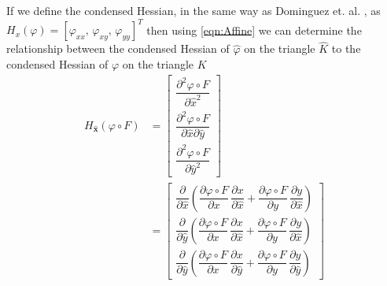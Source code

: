 If we define the condensed Hessian, in the same way as Dominguez et. al.
\cite{Dominguez08}, as $H_x(\varphi) = \left[ \varphi_{xx},\, \varphi_{xy},\,
\varphi_{yy}\right]^T$ then using \eqref{eqn:Affine} we can determine the
relationship between the condensed Hessian of $\hat{\varphi}$ on the triangle
$\hat{K}$ to the condensed Hessian of $\varphi$ on the triangle $K$
\begin{align*}
  H_{\mathbf{\hat{x}}}(\varphi\circ F) &= \begin{bmatrix}
    \dfrac{\partial^2 \varphi\circ F}{\partial \hat{x}^2} \\[1em]
    \dfrac{\partial^2 \varphi\circ F}{\partial \hat{x} \partial\hat{y}} \\[1em]
    \dfrac{\partial^2 \varphi\circ F}{\partial \hat{y}^2}
  \end{bmatrix} \\
  &= \begin{bmatrix}
    \dfrac{\partial}{\partial \hat{x}}\left( \dfrac{\partial \varphi\circ
      F}{\partial x}\, \dfrac{\partial x}{\partial \hat{x}} + \dfrac{\partial
      \varphi\circ F}{\partial y}\, \dfrac{\partial y}{\partial
      \hat{x}} \right) \\[1em]
    \dfrac{\partial}{\partial \hat{y}}\left( \dfrac{\partial \varphi\circ
      F}{\partial x}\, \dfrac{\partial x}{\partial \hat{x}} + \dfrac{\partial
      \varphi\circ F}{\partial y}\, \dfrac{\partial y}{\partial
      \hat{x}} \right) \\[1em]
    \dfrac{\partial}{\partial \hat{y}}\left( \dfrac{\partial \varphi\circ
      F}{\partial x}\, \dfrac{\partial x}{\partial \hat{y}} + \dfrac{\partial
      \varphi\circ F}{\partial y}\, \dfrac{\partial y}{\partial
      \hat{y}} \right)
  \end{bmatrix}
\end{align*}
